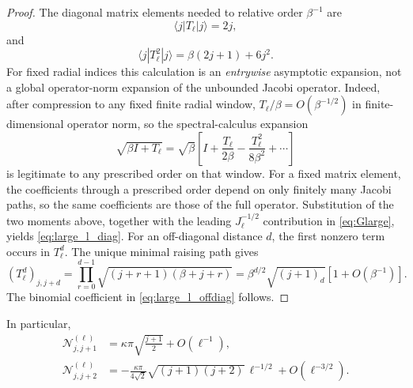 \documentclass[11pt]{article}
\numberwithin{equation}{section}
\theoremstyle{definition}
\begin{document}
\begin{proof}
The diagonal matrix elements needed to relative order $\beta^{-1}$ are
\begin{equation}
 \langle j|T_\ell|j\rangle=2j,
\end{equation}
and
\begin{equation}
 \langle j|T_\ell^2|j\rangle
 =
 \beta(2j+1)+6j^2.
\end{equation}
For fixed radial indices this calculation is an \emph{entrywise}
asymptotic expansion, not a global operator-norm expansion of the unbounded
Jacobi operator.  Indeed, after compression to any fixed finite radial window,
$T_\ell/\beta=O(\beta^{-1/2})$ in finite-dimensional operator norm, so the
spectral-calculus expansion
\begin{equation}
 \sqrt{\beta I+T_\ell}
 =
 \sqrt\beta
 \left[
 I+\frac{T_\ell}{2\beta}
 -\frac{T_\ell^2}{8\beta^2}+\cdots
 \right]
\end{equation}
is legitimate to any prescribed order on that window.  For a fixed matrix
element, the coefficients through a prescribed order depend on only finitely
many Jacobi paths, so the same coefficients are those of the full operator.
Substitution of the two moments above, together with the leading
$J_\ell^{-1/2}$ contribution in \eqref{eq:Glarge}, yields
\eqref{eq:large_l_diag}.  For an off-diagonal
distance $d$, the first nonzero term occurs in $T_\ell^d$.  The unique minimal
raising path gives
\begin{equation}
 (T_\ell^d)_{j,j+d}
 =
 \prod_{r=0}^{d-1}
 \sqrt{(j+r+1)(\beta+j+r)}
 =
 \beta^{d/2}\sqrt{(j+1)_d}
 [1+O(\beta^{-1})].
\end{equation}
The binomial coefficient in \eqref{eq:large_l_offdiag} follows.
\end{proof}

In particular,
\begin{align}
 \mathcal N^{(\ell)}_{j,j+1}
 &=
 \kappa\pi\sqrt{\frac{j+1}{2}}
 +O(\ell^{-1}),
 \label{eq:l_nn}
 \\
 \mathcal N^{(\ell)}_{j,j+2}
 &=
 -\frac{\kappa\pi}{4\sqrt2}
 \sqrt{(j+1)(j+2)}\,\ell^{-1/2}
 +O(\ell^{-3/2}).
\end{align}
\end{document}
